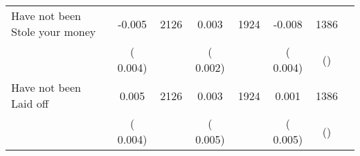 \begin{tabular}{l*{6}{c}}
Have not been Stole your money        &             -0.005      &       2126       &              0.003      &       1924       &             -0.008      &       1386  &  &              \\
                       &       (       0.004)            &                               &       (       0.002)            &                               &       (       0.004)            &       () &                  \\
Have not been Laid off        &              0.005      &       2126       &              0.003      &       1924       &              0.001      &       1386  &  &              \\
                       &       (       0.004)            &                               &       (       0.005)            &                               &       (       0.005)            &       () &                  \\
\hline \end{tabular}